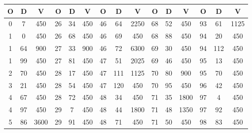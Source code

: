 \begin{center}
    \begin{tabular}{|c|c|c||c|c|c||c|c|c||c|c|c||c|c|c|}
        \hline
        \textbf{O} & \textbf{D} & \textbf{V} & \textbf{O} & \textbf{D} & \textbf{V} & \textbf{O} & \textbf{D} & \textbf{V} & \textbf{O} & \textbf{D} & \textbf{V} & \textbf{O} & \textbf{D} & \textbf{V} \\
        \hline
        0          & 7          & 450        & 26         & 34         & 450        & 46         & 64         & 2250       & 68         & 52         & 450        & 93         & 61         & 1125       \\
        1          & 0          & 450        & 26         & 68         & 450        & 46         & 69         & 450        & 68         & 88         & 450        & 94         & 20         & 450        \\
        1          & 64         & 900        & 27         & 33         & 900        & 46         & 72         & 6300       & 69         & 30         & 450        & 94         & 112        & 450        \\
        1          & 99         & 450        & 27         & 81         & 450        & 47         & 51         & 2025       & 69         & 46         & 450        & 95         & 13         & 450        \\
        2          & 70         & 450        & 28         & 17         & 450        & 47         & 111        & 1125       & 70         & 80         & 900        & 95         & 70         & 450        \\
        3          & 21         & 450        & 28         & 54         & 450        & 47         & 120        & 450        & 70         & 95         & 450        & 96         & 42         & 450        \\
        4          & 67         & 450        & 28         & 72         & 450        & 48         & 34         & 450        & 71         & 35         & 1800       & 97         & 4          & 450        \\
        4          & 97         & 450        & 29         & 7          & 450        & 48         & 44         & 1800       & 71         & 48         & 1350       & 97         & 92         & 450        \\
        5          & 86         & 3600       & 29         & 91         & 450        & 48         & 71         & 450        & 71         & 50         & 450        & 98         & 83         & 450        \\

\end{tabular}
\end{center}
